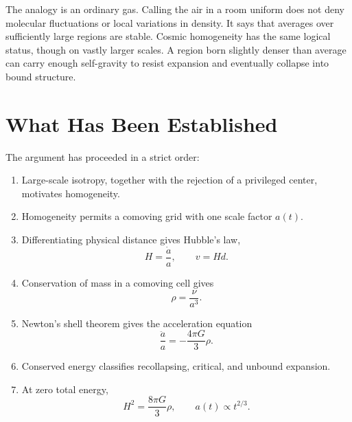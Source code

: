 The analogy is an ordinary gas. Calling the air in a room uniform does not deny molecular fluctuations or local variations in density. It says that averages over sufficiently large regions are stable. Cosmic homogeneity has the same logical status, though on vastly larger scales. A region born slightly denser than average can carry enough self-gravity to resist expansion and eventually collapse into bound structure.

\begin{classroomqa}
\end{classroomqa}

\begin{classroomqa}
\end{classroomqa}

\section{What Has Been Established}

The argument has proceeded in a strict order:
\begin{enumerate}
\item Large-scale isotropy, together with the rejection of a privileged center, motivates homogeneity.
\item Homogeneity permits a comoving grid with one scale factor \(a(t)\).
\item Differentiating physical distance gives Hubble's law,
  \[
  H=\frac{\dot a}{a},
  \qquad
  v=Hd.
  \]
\item Conservation of mass in a comoving cell gives
  \[
  \rho=\frac{\nu}{a^3}.
  \]
\item Newton's shell theorem gives the acceleration equation
  \[
  \frac{\ddot a}{a}=-\frac{4\pi G}{3}\rho.
  \]
\item Conserved energy classifies recollapsing, critical, and unbound expansion.
\item At zero total energy,
  \[
  H^2=\frac{8\pi G}{3}\rho,
  \qquad
  a(t)\propto t^{2/3}.
  \]
\end{enumerate}

